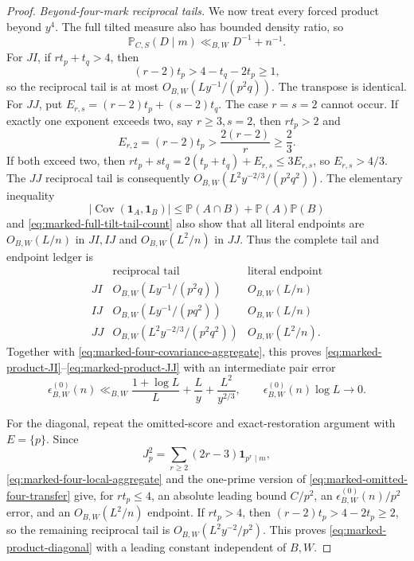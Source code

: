 \documentclass[11pt]{article}
\numberwithin{equation}{section}
\theoremstyle{definition}
\theoremstyle{remark}
\newcommand{\1}{\mathbf 1}
\begin{document}
\begin{proof}
\medskip\noindent\emph{Beyond-four-mark reciprocal tails.}\quad
We now treat every forced product beyond \(y^4\).  The full tilted
measure also has bounded density ratio, so
\begin{equation}
 \mathbb P_{C,S}(D\mid m)\ll_{B,W}D^{-1}+n^{-1}.
 \label{eq:marked-full-tilt-tail-count}
\end{equation}
For \(JI\), if \(rt_p+t_q>4\), then
\[
 (r-2)t_p>4-t_q-2t_p\ge1,
\]
so the reciprocal tail is at most
\(O_{B,W}(Ly^{-1}/(p^2q))\).  The transpose is identical.  For \(JJ\),
put \(E_{r,s}=(r-2)t_p+(s-2)t_q\).  The case \(r=s=2\) cannot occur.
If exactly one exponent exceeds two, say \(r\ge3,s=2\), then
\(rt_p>2\) and
\[
 E_{r,2}=(r-2)t_p>\frac{2(r-2)}r\ge\frac23.
\]
If both exceed two, then
\(rt_p+st_q=2(t_p+t_q)+E_{r,s}\le3E_{r,s}\), so
\(E_{r,s}>4/3\).  The \(JJ\) reciprocal tail is consequently
\(O_{B,W}(L^2y^{-2/3}/(p^2q^2))\).  The elementary inequality
\[
 |\operatorname{Cov}(\1_A,\1_B)|
 \le\mathbb P(A\cap B)+\mathbb P(A)\mathbb P(B)
\]
and \eqref{eq:marked-full-tilt-tail-count} also show that all literal
endpoints are \(O_{B,W}(L/n)\) in \(JI,IJ\) and
\(O_{B,W}(L^2/n)\) in \(JJ\).  Thus the complete tail and endpoint
ledger is
\begin{equation}
 \begin{array}{c|c|c}
  &\text{reciprocal tail}&\text{literal endpoint}\\ \hline
 JI&O_{B,W}(Ly^{-1}/(p^2q))&O_{B,W}(L/n)\\
 IJ&O_{B,W}(Ly^{-1}/(pq^2))&O_{B,W}(L/n)\\
 JJ&O_{B,W}(L^2y^{-2/3}/(p^2q^2))&O_{B,W}(L^2/n).
 \end{array}
 \label{eq:marked-four-tail-endpoint-ledger}
\end{equation}
Together with
\eqref{eq:marked-four-covariance-aggregate}, this proves
\eqref{eq:marked-product-JI}--\eqref{eq:marked-product-JJ} with an
intermediate pair error
\begin{equation}
 \epsilon^{(0)}_{B,W}(n)
 \ll_{B,W}\frac{1+\log L}{L}+\frac Ly+\frac{L^2}{y^{2/3}},
 \qquad \epsilon^{(0)}_{B,W}(n)\log L\longrightarrow0.
 \label{eq:marked-pair-error-explicit-rate}
\end{equation}

For the diagonal, repeat the omitted-score and exact-restoration argument
with \(E=\{p\}\).  Since
\[
 J_p^2=\sum_{r\ge2}(2r-3)\1_{p^r\mid m},
\]
\eqref{eq:marked-four-local-aggregate} and the one-prime version of
\eqref{eq:marked-omitted-four-transfer} give, for \(rt_p\le4\), an
absolute leading bound \(C/p^2\), an
\(\epsilon^{(0)}_{B,W}(n)/p^2\) error, and an
\(O_{B,W}(L^2/n)\) endpoint.  If \(rt_p>4\), then
\((r-2)t_p>4-2t_p\ge2\), so the remaining reciprocal tail is
\(O_{B,W}(L^2y^{-2}/p^2)\).  This proves
\eqref{eq:marked-product-diagonal} with a leading constant independent
of \(B,W\).


\end{proof}
\end{document}
